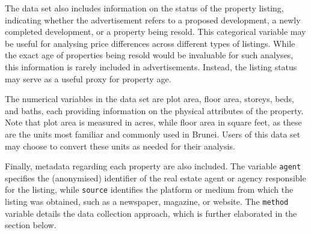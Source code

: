 \documentclass[
  number]{elsarticle}
\begin{document}
The data set also includes information on the status of the property
listing, indicating whether the advertisement refers to a proposed
development, a newly completed development, or a property being resold.
This categorical variable may be useful for analysing price differences
across different types of listings. While the exact age of properties
being resold would be invaluable for such analyses, this information is
rarely included in advertisements. Instead, the listing status may serve
as a useful proxy for property age.

The numerical variables in the data set are plot area, floor area,
storeys, beds, and baths, each providing information on the physical
attributes of the property. Note that plot area is measured in acres,
while floor area in square feet, as these are the units most familiar
and commonly used in Brunei. Users of this data set may choose to
convert these units as needed for their analysis.

Finally, metadata regarding each property are also included. The
variable \texttt{agent} specifies the (anonymised) identifier of the
real estate agent or agency responsible for the listing, while
\texttt{source} identifies the platform or medium from which the listing
was obtained, such as a newspaper, magazine, or website. The
\texttt{method} variable details the data collection approach, which is
further elaborated in the section below.
\end{document}
